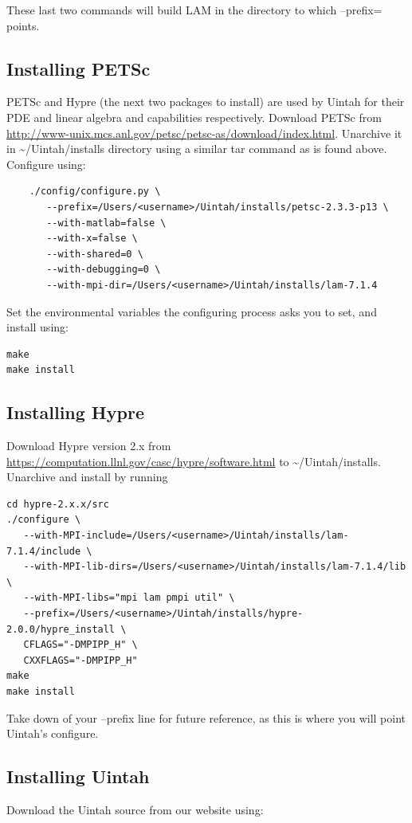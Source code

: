 \documentclass[12pt]{article}
\begin{document}
These last two commands will build LAM in the directory to which
--prefix= points.

\subsection{Installing PETSc}
PETSc and Hypre (the next two packages to install) are used by Uintah
for their PDE and linear algebra and capabilities respectively.
Download PETSc from
\url{http://www-unix.mcs.anl.gov/petsc/petsc-as/download/index.html}.
Unarchive it in \textasciitilde/Uintah/installs directory using a
similar tar command as is found above.  Configure using:

\begin{verbatim}
	./config/configure.py \
	   --prefix=/Users/<username>/Uintah/installs/petsc-2.3.3-p13 \
	   --with-matlab=false \
	   --with-x=false \
	   --with-shared=0 \
	   --with-debugging=0 \
	   --with-mpi-dir=/Users/<username>/Uintah/installs/lam-7.1.4
\end{verbatim}

Set the environmental variables the configuring process asks you to
set, and install using:

\begin{verbatim}
make
make install
\end{verbatim}

\subsection{Installing Hypre}
Download Hypre version 2.x from
\url{https://computation.llnl.gov/casc/hypre/software.html} to
\textasciitilde/Uintah/installs.  Unarchive and install by running

\begin{verbatim}
cd hypre-2.x.x/src
./configure \
   --with-MPI-include=/Users/<username>/Uintah/installs/lam-7.1.4/include \
   --with-MPI-lib-dirs=/Users/<username>/Uintah/installs/lam-7.1.4/lib \
   --with-MPI-libs="mpi lam pmpi util" \
   --prefix=/Users/<username>/Uintah/installs/hypre-2.0.0/hypre_install \
   CFLAGS="-DMPIPP_H" \
   CXXFLAGS="-DMPIPP_H" 
make
make install
\end{verbatim}

Take down of your --prefix line for future reference, as this is where
you will point Uintah's configure.

\subsection{Installing Uintah}
Download the Uintah source from our website using:
\end{document}
